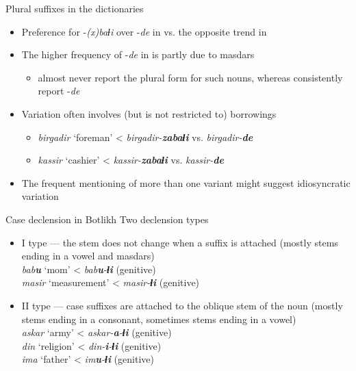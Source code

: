 \begin{frame}{Plural suffixes in the dictionaries}
\begin{itemize}
    \item Preference for -\textit{(x)baɬi} over -\textit{de} in \citep{saidovaabusov2012} vs. the opposite trend in \citep{alekseev2019}
    \item The higher frequency of -\textit{de} in \citep{alekseev2019} is partly due to masdars
    \begin{itemize}
        \item \citep{saidovaabusov2012} almost never report the plural form for such nouns, whereas \citep{alekseev2019} consistently report -\textit{de}
    \end{itemize}
    \item Variation often involves (but is not restricted to) borrowings
    \begin{itemize}
        \item \textit{birgadir} `foreman' < \textit{birgadir-\textbf{zabaɬi}} vs. \textit{birgadir-\textbf{de}}
        \item \textit{kassir} `cashier' < \textit{kassir-\textbf{zabaɬi}} vs. \textit{kassir-\textbf{de}}
    \end{itemize}
    \item The frequent mentioning of more than one variant might suggest idiosyncratic variation
\end{itemize}
\end{frame}

\begin{frame}{Case declension in Botlikh}
Two declension types
\begin{itemize}
    \item I type --- the stem does not change when a suffix is attached (mostly stems ending in a vowel and masdars) \\ \textit{bab\textbf{u}} `mom' < \textit{bab\textbf{u}-\textbf{ɬi}} (genitive) \\ \textit{masir} `measurement' < \textit{masir-\textbf{ɬi}} (genitive)  
    \item II type --- case suffixes are attached to the oblique stem of the noun (mostly stems ending in a consonant, sometimes stems ending in a vowel) \\ \textit{askar} `army' < \textit{askar-\textbf{a}-\textbf{ɬi}} (genitive) \\ \textit{din} `religion' < \textit{din-\textbf{i}-\textbf{ɬi}} (genitive) \\ \textit{ima} `father' < \textit{im\textbf{u}-\textbf{ɬi}} (genitive) 
\end{itemize}
\end{frame}

